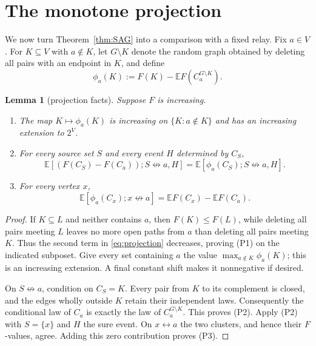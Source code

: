 \documentclass[11pt]{article}
\newtheorem{lemma}[theorem]{Lemma}
\theoremstyle{definition}
\theoremstyle{remark}
\newcommand{\EE}{\mathbb E}
\newcommand{\con}{\leftrightarrow}
\newcommand{\ncon}{\not\leftrightarrow}
\begin{document}
\section{The monotone projection}\label{sec:projection}

We now turn Theorem~\ref{thm:SAG} into a comparison with a fixed relay.
Fix $a\in V$.  For $K\subseteq V$ with $a\notin K$, let $G\setminus K$
denote the random graph obtained by deleting all pairs with an endpoint in
$K$, and define
\begin{equation}\label{eq:projection}
 \phi_a(K):=F(K)-\EE F(C_a^{G\setminus K}).
\end{equation}

\begin{lemma}[projection facts]\label{lem:projection}
Suppose $F$ is increasing.
\begin{enumerate}[label=\textup{(P\arabic*)},leftmargin=3em]
\item The map $K\mapsto\phi_a(K)$ is increasing on
  $\{K:a\notin K\}$ and has an increasing extension to $2^V$.
\item For every source set $S$ and every event $H$ determined by $C_S$,
  \begin{equation}\label{eq:projection-source}
   \EE[(F(C_S)-F(C_a));S\ncon a,H]
   =\EE[\phi_a(C_S);S\ncon a,H].
  \end{equation}
\item For every vertex $x$,
  \begin{equation}\label{eq:projection-mean}
   \EE[\phi_a(C_x);x\ncon a]
   =\EE F(C_x)-\EE F(C_a).
  \end{equation}
\end{enumerate}
\end{lemma}

\begin{proof}
If $K\subseteq L$ and neither contains $a$, then $F(K)\leq F(L)$, while
deleting all pairs meeting $L$ leaves no more open paths from $a$ than
deleting all pairs meeting $K$.  Thus the second term in
\eqref{eq:projection} decreases, proving (P1) on the indicated subposet.
Give every set containing $a$ the value
$\max_{a\notin K}\phi_a(K)$; this is an increasing extension.  A final
constant shift makes it nonnegative if desired.

On $S\ncon a$, condition on $C_S=K$.  Every pair from $K$ to its
complement is closed, and the edges wholly outside $K$ retain their
independent laws.  Consequently the conditional law of $C_a$ is exactly
the law of $C_a^{G\setminus K}$.  This proves (P2).  Apply (P2) with
$S=\{x\}$ and $H$ the sure event.  On $x\con a$ the two clusters, and
hence their $F$-values, agree.  Adding this zero contribution proves
(P3).
\end{proof}
\end{document}

